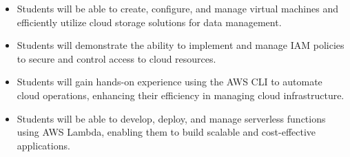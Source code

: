 \begin{itemize}
    \item Students will be able to create, configure, and manage virtual machines and efficiently utilize cloud storage solutions for data management.
    \item Students will demonstrate the ability to implement and manage IAM policies to secure and control access to cloud resources.
    \item Students will gain hands-on experience using the AWS CLI to automate cloud operations, enhancing their efficiency in managing cloud infrastructure.
    \item Students will be able to develop, deploy, and manage serverless functions using AWS Lambda, enabling them to build scalable and cost-effective applications.
\end{itemize}
